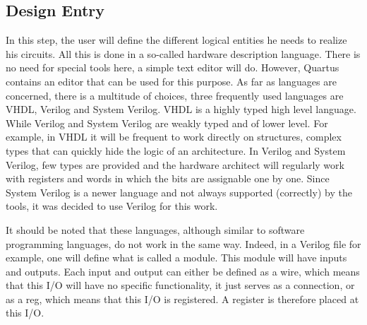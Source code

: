 \subsection{Design Entry}

In this step, the user will define the different logical entities he needs to realize his circuits. 
All this is done in a so-called hardware description language. There is no need for special tools 
here, a simple text editor will do. However, Quartus contains an editor that can be used for this 
purpose. As far as languages are concerned, there is a multitude of choices, three frequently used 
languages are VHDL, Verilog and System Verilog. VHDL is a highly typed high level language. While 
Verilog and System Verilog are weakly typed and of lower level. For example, in VHDL it will be 
frequent to work directly on structures, complex types that can quickly hide the logic of an 
architecture. In Verilog and System Verilog, few types are provided and the hardware architect will 
regularly work with registers and words in which the bits are assignable one by one. Since System 
Verilog is a newer language and not always supported (correctly) by the tools, it was decided to use 
Verilog for this work. 

It should be noted that these languages, although similar to software programming languages, do not 
work in the same way. Indeed, in a Verilog file for example, one will define what is called a module. 
This module will have inputs and outputs. Each input and output can either be defined as a wire, 
which means that this I/O will have no specific functionality, it just serves as a connection, or 
as a reg, which means that this I/O is registered. A register is therefore placed at this I/O. 

